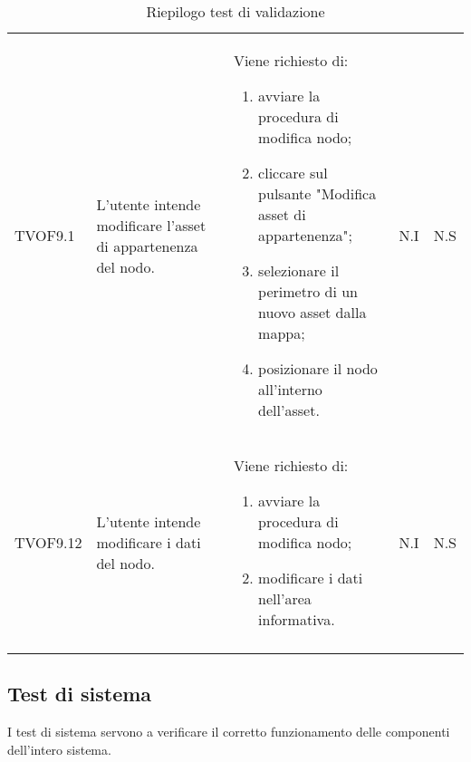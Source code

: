 \begin{longtable}{p{1.8cm}!{\VRule[1pt]}p{3.5cm}!{\VRule[1pt]}p{5.5cm}!{\VRule[1pt]}p{1cm}!{\VRule[1pt]}p{1cm}}
	TVOF9.1 & L'utente intende modificare l'asset di appartenenza del nodo. & Viene richiesto di: \begin{enumerate} 
		\item avviare la procedura di modifica nodo; 
		\item cliccare sul pulsante "Modifica asset di appartenenza"; 
		\item selezionare il perimetro di un nuovo asset dalla mappa; 
		\item posizionare il nodo all'interno dell'asset. 
	\end{enumerate} & N.I & N.S \\ 
	TVOF9.12 & L'utente intende modificare i dati del nodo. & Viene richiesto di: \begin{enumerate} 
		\item avviare la procedura di modifica nodo; 
		\item modificare i dati nell'area informativa. 
	\end{enumerate} & N.I & N.S \\ 
	\caption{Riepilogo test di validazione}
\end{longtable}

	\subsection{Test di sistema}
		I test di sistema servono a verificare il corretto funzionamento delle componenti dell'intero sistema.
		

